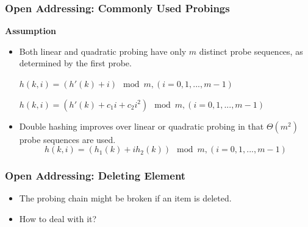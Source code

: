 \documentclass[UTF8,11pt]{beamer}
\begin{document}
\begin{frame}
\frametitle{Open Addressing: Commonly Used Probings}
\begin{block}{}
\begin{center}
	
\pause
\textbf{\color{red}Assumption}


\begin{itemize}
	\pause\item Both linear and quadratic probing have only {\color{blue}$m$ distinct probe sequences}, as determined by the first probe.
	\begin{center}
		$h(k,i) = (h'(k)+i)\mod {m},  (i=0,1,...,m-1)$
		
		$h(k,i) = (h'(k)+c_1i+ c_2i^2) \mod m,   (i=0,1,...,m-1)$
	\end{center}
	\pause\item Double hashing improves over linear or quadratic probing in that {\color{blue}$\Theta(m^2)$ probe sequences} are used.
	\[h(k,i) = (h_1(k)+ ih_2(k)) \mod m, (i=0,1,...,m-1)\]
\end{itemize}
\end{center}
\end{block}
\end{frame}

\begin{frame}
\frametitle{Open Addressing: Deleting Element}
	\begin{center}
		
		\begin{itemize}
			\pause\item The probing chain might be broken if an item is deleted.
			\pause \item How to deal with it?
		\end{itemize}
	\end{center}
\end{frame}
\end{document}
